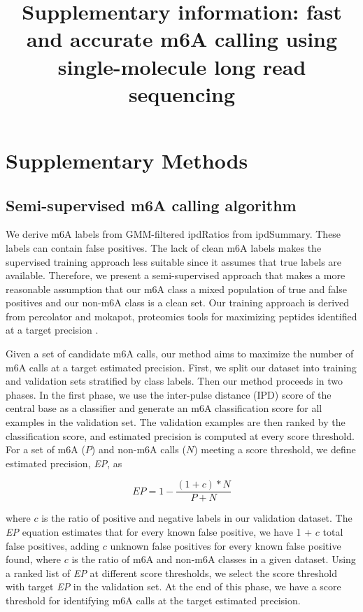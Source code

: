 \documentclass{article}
\date{}
\title{Supplementary information: fast and accurate m6A calling using single-molecule long read sequencing}
\begin{document}
\maketitle

\section{Supplementary Methods}
\subsection{Semi-supervised m6A calling algorithm}
We derive m6A labels from GMM-filtered ipdRatios from ipdSummary. These labels can contain false positives. The lack of clean m6A labels makes the supervised training approach less suitable since it assumes that true labels are available. Therefore, we present a semi-supervised approach that makes a more reasonable assumption that our m6A class a mixed population of true and false positives and our non-m6A class is a clean set. Our training approach is derived from percolator and mokapot, proteomics tools for maximizing peptides identified at a target precision \cite{fondrie2021mokapot,kall2007semi}.  

Given a set of candidate m6A calls, our method aims to maximize the number of m6A calls at a target estimated precision. First, we split our dataset into training and validation sets stratified by class labels. Then our method proceeds in two phases. In the first phase, we use the inter-pulse distance (IPD) score of the central base as a classifier and generate an m6A classification score for all examples in the validation set. The validation examples are then ranked by the classification score, and estimated precision is computed at every score threshold.  For a set of m6A ($P$) and non-m6A calls ($N$) meeting a score threshold, we define estimated precision, \textit{EP}, as 

\begin{equation}
EP = 1-\frac{(1 + c) * N}{P + N} 
\end{equation}

where $c$ is the ratio of positive and negative labels in our validation dataset. The \textit{EP} equation estimates that for every known false positive, we have 1 + $c$ total false positives, adding $c$ unknown false positives for every known false positive found, where $c$ is the ratio of m6A and non-m6A classes in a given dataset. Using a ranked list of \textit{EP} at different score thresholds, we select the score threshold with target \textit{EP} in the validation set.  At the end of this phase, we have a score threshold for identifying m6A calls at the target estimated precision. 
\end{document}
